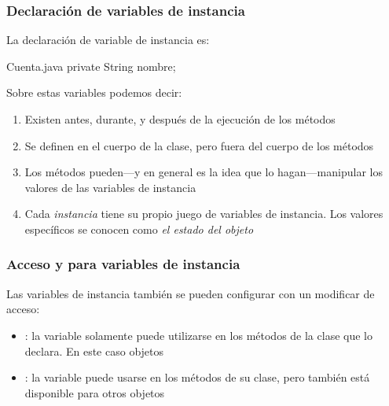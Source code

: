 \documentclass{beamer}
\begin{document}
\begin{frame}[fragile]
  \frametitle{Declaración de variables de instancia}

  La declaración de variable de instancia es:
  
  \begin{java}{Cuenta.java}
    private String nombre;
  \end{java}

  Sobre estas variables podemos decir:

  \begin{enumerate}
  \item Existen antes, durante, y después de la ejecución de los
    métodos
    
  \item Se definen en el cuerpo de la clase, pero fuera del cuerpo de
    los métodos
    
  \item Los métodos pueden---y en general es la idea que lo
    hagan---manipular los valores de las variables de instancia
    
  \item Cada \emph{instancia} tiene su propio juego de variables de
    instancia. Los valores específicos se conocen como \emph{el estado
      del objeto}
    
  \end{enumerate}
  
\end{frame}

\begin{frame}
  \frametitle{Acceso  y  para variables de
    instancia}

  Las variables de instancia también se pueden configurar con un
  modificar de acceso:

  \begin{itemize}
  \item {}: la variable solamente puede utilizarse en los
    métodos de la clase que lo declara. En este caso objetos
    
  \item {}: la variable puede usarse en los métodos de su
    clase, pero también está disponible para otros objetos
  \end{itemize}
  
\end{frame}
\end{document}
